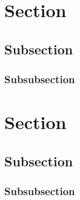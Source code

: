 



\fontsize{13}{18} \selectfont
\setlength{\parindent}{1.27cm}
\setlength{\parskip}{8pt}



\setcounter{page}{1}
\pagestyle{fancy}
\section{Section}
\subsection{Subsection}
\subsubsection{Subsubsection}
\newpage
\setcounter{page}{1}
\pagestyle{fancy}
\section{Section}
\subsection{Subsection}
\subsubsection{Subsubsection}




